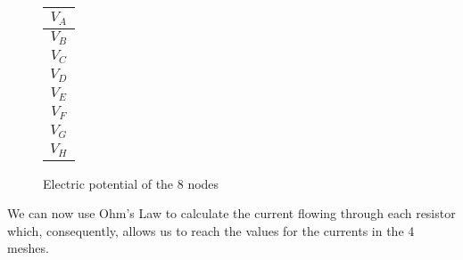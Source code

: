 \begin{figure}[h]
	\begin{center}
	    \begin{minipage}{.3\textwidth}
		\flushright
		\begin{tabular}{|c|}
		    \hline
		    $V_A$ \\
		    \hline
		    $V_B$ \\
		    \hline
		    $V_C$ \\
		    \hline
		    $V_D$ \\
		    \hline
		    $V_E$ \\
		    \hline
		    $V_F$ \\
		    \hline
		    $V_G$ \\
		    \hline
		    $V_H$ \\
		    \hline
		\end{tabular}
	    \end{minipage}
	    \hspace{-8pt}
	    \begin{minipage}{.3\textwidth}
		\flushleft
		
	    \end{minipage}
	\end{center}
	\caption{Electric potential of the 8 nodes}
	\label{theory_voltages}
\end{figure}

We can now use Ohm's Law to calculate the current flowing through each resistor which, consequently, allows us to reach the values for the currents in the 4 meshes.
